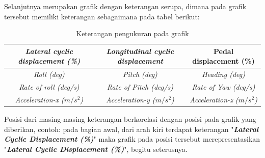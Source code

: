 Selanjutnya merupakan grafik dengan keterangan serupa, dimana pada grafik tersebut memiliki keterangan sebagaimana pada tabel berikut:

\begin{table}[]
	\caption{Keterangan pengukuran pada grafik}
	\begin{tabular}{|c|c|c|}
		\hline
		\textit{Lateral cyclic displacement (\%)} & \textit{Longitudinal cyclic displacement} & Pedal displacement (\%)           \\ \hline
		\textit{Roll (deg)}                       & \textit{Pitch (deg)}                      & \textit{Heading (deg)}            \\ \hline
		\textit{Rate of roll (deg/s)}             & \textit{Rate of Pitch (deg/s)}            & \textit{Rate of Yaw (deg/s)}      \\ \hline
		\textit{Acceleration-x ($m/s^2$)}         & \textit{Acceleration-y ($m/s^2$)}         & \textit{Acceleration-z ($m/s^2$)} \\ \hline
	\end{tabular}
\end{table}

Posisi dari masing-masing keterangan berkorelasi dengan posisi pada grafik yang diberikan, contoh: pada bagian awal, dari arah kiri terdapat keterangan "\textbf{\textit{Lateral Cyclic Displacement (\%)}}" maka grafik pada posisi tersebut merepresentasikan "\textbf{\textit{Lateral Cyclic Displacement (\%)}}", begitu seterusnya.

